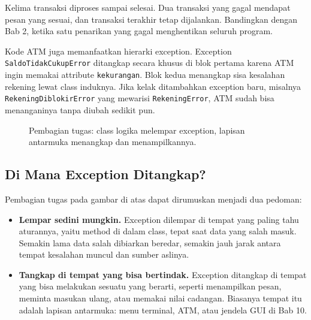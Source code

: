 Kelima transaksi diproses sampai selesai. Dua transaksi yang gagal mendapat pesan yang sesuai, dan transaksi terakhir tetap dijalankan. Bandingkan dengan Bab 2, ketika satu penarikan yang gagal menghentikan seluruh program.

Kode ATM juga memanfaatkan hierarki exception. Exception \texttt{SaldoTidakCukupError} ditangkap secara khusus di blok pertama karena ATM ingin memakai attribute \texttt{kekurangan}. Blok kedua menangkap sisa kesalahan rekening lewat class induknya. Jika kelak ditambahkan exception baru, misalnya \texttt{RekeningDiblokirError} yang mewarisi \texttt{RekeningError}, ATM sudah bisa menanganinya tanpa diubah sedikit pun.

\begin{figure}[htbp]
\centering
{}
\caption{Pembagian tugas: class logika melempar exception, lapisan antarmuka menangkap dan menampilkannya.}
\end{figure}

\subsection{Di Mana Exception Ditangkap?}

Pembagian tugas pada gambar di atas dapat dirumuskan menjadi dua pedoman:

\begin{itemize}
  \item \textbf{Lempar sedini mungkin.} Exception dilempar di tempat yang paling tahu aturannya, yaitu method di dalam class, tepat saat data yang salah masuk. Semakin lama data salah dibiarkan beredar, semakin jauh jarak antara tempat kesalahan muncul dan sumber aslinya.
  \item \textbf{Tangkap di tempat yang bisa bertindak.} Exception ditangkap di tempat yang bisa melakukan sesuatu yang berarti, seperti menampilkan pesan, meminta masukan ulang, atau memakai nilai cadangan. Biasanya tempat itu adalah lapisan antarmuka: menu terminal, ATM, atau jendela GUI di Bab 10.
\end{itemize}

